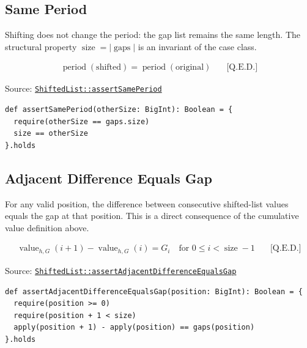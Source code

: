 \subsection{Same Period}

Shifting does not change the period: the gap list remains the same
length. The structural property $\operatorname{size} = |\operatorname{gaps}|$
is an invariant of the case class.

\begin{equation*}
\begin{aligned}
\operatorname{period}(\text{shifted}) = \operatorname{period}(\text{original}) \quad &\text{[Q.E.D.]}
\end{aligned}
\end{equation*}

Source:
\href{https://github.com/thiagomata/prime-numbers/blob/list-article-v1.0.0/src/main/scala/v1/chapter3/list/ShiftedList.scala}{\texttt{ShiftedList::assertSamePeriod}}

\begin{lstlisting}[style=scala]
def assertSamePeriod(otherSize: BigInt): Boolean = {
  require(otherSize == gaps.size)
  size == otherSize
}.holds
\end{lstlisting}

\subsection{Adjacent Difference Equals Gap}

For any valid position, the difference between consecutive shifted-list
values equals the gap at that position. This is a direct consequence of
the cumulative value definition above.

\begin{equation*}
\begin{aligned}
\operatorname{value}_{h,G}(i + 1) - \operatorname{value}_{h,G}(i) = G_i
\quad \text{for } 0 \leq i < \operatorname{size} - 1 \quad &\text{[Q.E.D.]}
\end{aligned}
\end{equation*}

Source:
\href{https://github.com/thiagomata/prime-numbers/blob/list-article-v1.0.0/src/main/scala/v1/chapter3/list/ShiftedList.scala}{\texttt{ShiftedList::assertAdjacentDifferenceEqualsGap}}

\begin{lstlisting}[style=scala]
def assertAdjacentDifferenceEqualsGap(position: BigInt): Boolean = {
  require(position >= 0)
  require(position + 1 < size)
  apply(position + 1) - apply(position) == gaps(position)
}.holds
\end{lstlisting}

